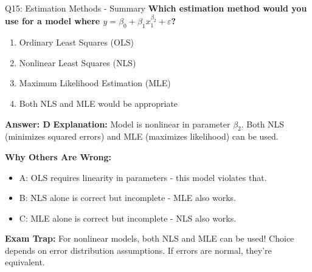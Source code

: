 \documentclass[8pt]{beamer}
\begin{document}
	\begin{frame}{Q15: Estimation Methods - Summary}
		\fontsize{6.5}{7.5}\selectfont
		\textbf{Which estimation method would you use for a model where $y = \beta_0 + \beta_1 x_1^{\beta_2} + \varepsilon$?}
		
		\begin{enumerate}
			\item Ordinary Least Squares (OLS)
			\item Nonlinear Least Squares (NLS)
			\item Maximum Likelihood Estimation (MLE)
			\item Both NLS and MLE would be appropriate
		\end{enumerate}
		
		\vspace{0.05cm}
		\textcolor{myblue}{\textbf{Answer: D}}
		\vspace{0.05cm}
		\textcolor{myblue}{\textbf{Explanation:}} Model is nonlinear in parameter $\beta_2$. Both NLS (minimizes squared errors) and MLE (maximizes likelihood) can be used.
		
		\vspace{0.05cm}
		\textcolor{myred}{\textbf{Why Others Are Wrong:}}
		\begin{itemize}
			\item \textcolor{myred}{A:} OLS requires linearity in parameters - this model violates that.
			\item \textcolor{myred}{B:} NLS alone is correct but incomplete - MLE also works.
			\item \textcolor{myred}{C:} MLE alone is correct but incomplete - NLS also works.
		\end{itemize}
		
		\textcolor{myred}{\textbf{Exam Trap:}} For nonlinear models, both \textcolor{myblue}{NLS and MLE} can be used! Choice depends on error distribution assumptions. If errors are normal, they're equivalent.
	\end{frame}
	
	
\end{document}
